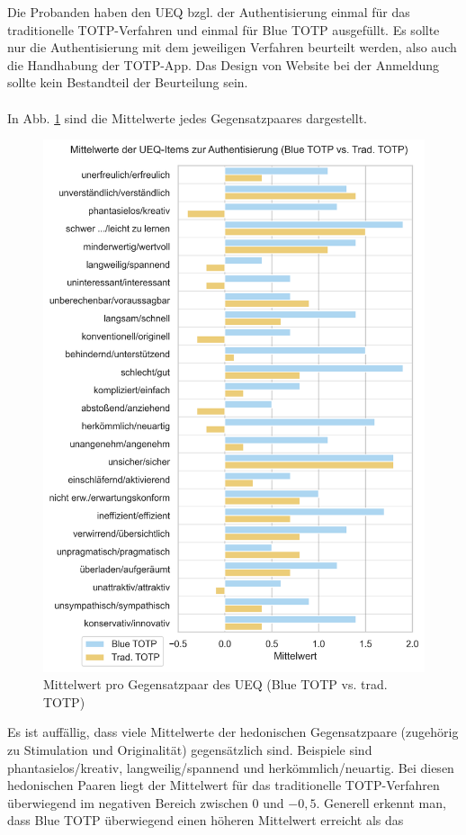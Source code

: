 Die Probanden haben den UEQ bzgl. der Authentisierung einmal für das traditionelle 
TOTP-Verfahren und einmal für Blue TOTP ausgefüllt. Es sollte nur die Authentisierung 
mit dem jeweiligen Verfahren beurteilt werden, also auch die Handhabung der TOTP-App. 
Das Design von Website bei der Anmeldung sollte kein Bestandteil der Beurteilung sein.
\\\\
In Abb. \ref{fig: studie ergebnisse auth ueq bt trad single} sind die Mittelwerte jedes Gegensatzpaares dargestellt.
\begin{figure}
    \centering
    \includegraphics[width=0.65\linewidth]{data_processing/questionaires/results/from_ueq_excel/ueq_single_means_bt_trad.png}
    \caption[Mittelwert pro Gegensatzpaar des UEQ (Blue TOTP vs. trad. TOTP)]{Mittelwert pro Gegensatzpaar des UEQ (Blue TOTP vs. trad. TOTP)}
    \label{fig: studie ergebnisse auth ueq bt trad single}
\end{figure}
Es ist auffällig, dass viele Mittelwerte der hedonischen Gegensatzpaare (zugehörig zu 
Stimulation und Originalität) gegensätzlich sind.
Beispiele sind \glqq phantasielos/kreativ\grqq{}, \glqq langweilig/spannend\grqq{} 
und \glqq herkömmlich/neuartig\grqq{}. 
Bei diesen hedonischen Paaren liegt der Mittelwert für das traditionelle 
TOTP-Verfahren überwiegend im negativen Bereich zwischen $0$ und $-0{,}5$. Generell 
erkennt man, dass Blue TOTP überwiegend einen höheren Mittelwert erreicht als das 
